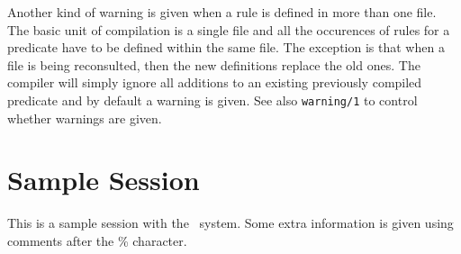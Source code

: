 \noindent
Another kind of warning is given when a rule is defined in more than
one file. The basic unit of compilation is a single file and all
the occurences of rules for a predicate have to be defined within
the same file. The exception is that when a file is being reconsulted,
then the new definitions replace the old ones. The compiler will
simply ignore all additions to an existing previously compiled
predicate and by default a warning is given. See also {\tt warning/1}
to control whether warnings are given.
\chgbarend

\section{Sample Session}\label{sample-session}

This is a sample session with the \CLPR\ system.
Some extra information is given using comments after the \% character.

